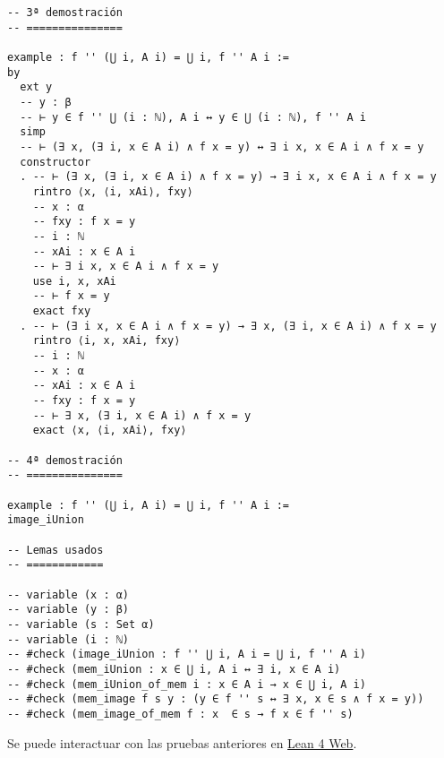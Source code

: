 \begin{verbatim}
-- 3ª demostración
-- ===============

example : f '' (⋃ i, A i) = ⋃ i, f '' A i :=
by
  ext y
  -- y : β
  -- ⊢ y ∈ f '' ⋃ (i : ℕ), A i ↔ y ∈ ⋃ (i : ℕ), f '' A i
  simp
  -- ⊢ (∃ x, (∃ i, x ∈ A i) ∧ f x = y) ↔ ∃ i x, x ∈ A i ∧ f x = y
  constructor
  . -- ⊢ (∃ x, (∃ i, x ∈ A i) ∧ f x = y) → ∃ i x, x ∈ A i ∧ f x = y
    rintro ⟨x, ⟨i, xAi⟩, fxy⟩
    -- x : α
    -- fxy : f x = y
    -- i : ℕ
    -- xAi : x ∈ A i
    -- ⊢ ∃ i x, x ∈ A i ∧ f x = y
    use i, x, xAi
    -- ⊢ f x = y
    exact fxy
  . -- ⊢ (∃ i x, x ∈ A i ∧ f x = y) → ∃ x, (∃ i, x ∈ A i) ∧ f x = y
    rintro ⟨i, x, xAi, fxy⟩
    -- i : ℕ
    -- x : α
    -- xAi : x ∈ A i
    -- fxy : f x = y
    -- ⊢ ∃ x, (∃ i, x ∈ A i) ∧ f x = y
    exact ⟨x, ⟨i, xAi⟩, fxy⟩

-- 4ª demostración
-- ===============

example : f '' (⋃ i, A i) = ⋃ i, f '' A i :=
image_iUnion

-- Lemas usados
-- ============

-- variable (x : α)
-- variable (y : β)
-- variable (s : Set α)
-- variable (i : ℕ)
-- #check (image_iUnion : f '' ⋃ i, A i = ⋃ i, f '' A i)
-- #check (mem_iUnion : x ∈ ⋃ i, A i ↔ ∃ i, x ∈ A i)
-- #check (mem_iUnion_of_mem i : x ∈ A i → x ∈ ⋃ i, A i)
-- #check (mem_image f s y : (y ∈ f '' s ↔ ∃ x, x ∈ s ∧ f x = y))
-- #check (mem_image_of_mem f : x  ∈ s → f x ∈ f '' s)
\end{verbatim}
Se puede interactuar con las pruebas anteriores en \href{https://lean.math.hhu.de/\#url=https://raw.githubusercontent.com/jaalonso/Calculemus2/main/src/Imagen\_de\_la\_union\_general.lean}{Lean 4 Web}.

